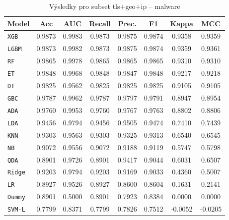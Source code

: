 \begin{table}[H]
  \centering
  \small
  \caption{Výsledky pro subset tls+geo+ip – malware}
  \begin{tabular}{|l|c|c|c|c|c|c|c|}
    \hline
    \textbf{Model} & \textbf{Acc} & \textbf{AUC} & \textbf{Recall} & \textbf{Prec.} & \textbf{F1} & \textbf{Kappa} & \textbf{MCC} \\
    \hline
    \texttt{XGB} & 0.9873 & 0.9983 & 0.9873 & 0.9875 & 0.9874 & 0.9358 & 0.9359 \\
    \texttt{LGBM} & 0.9873 & 0.9982 & 0.9873 & 0.9875 & 0.9874 & 0.9359 & 0.9361 \\
    \texttt{RF} & 0.9865 & 0.9978 & 0.9865 & 0.9865 & 0.9865 & 0.9310 & 0.9310 \\
    \texttt{ET} & 0.9848 & 0.9968 & 0.9848 & 0.9847 & 0.9848 & 0.9217 & 0.9218 \\
    \texttt{DT} & 0.9825 & 0.9562 & 0.9825 & 0.9825 & 0.9825 & 0.9105 & 0.9105 \\
    \texttt{GBC} & 0.9787 & 0.9962 & 0.9787 & 0.9797 & 0.9791 & 0.8947 & 0.8954 \\
    \texttt{ADA} & 0.9760 & 0.9953 & 0.9760 & 0.9767 & 0.9763 & 0.8802 & 0.8806 \\
    \texttt{LDA} & 0.9456 & 0.9794 & 0.9456 & 0.9505 & 0.9474 & 0.7410 & 0.7439 \\
    \texttt{KNN} & 0.9303 & 0.9563 & 0.9303 & 0.9325 & 0.9313 & 0.6540 & 0.6545 \\
    \texttt{NB} & 0.9072 & 0.9556 & 0.9072 & 0.9188 & 0.9119 & 0.5747 & 0.5798 \\
    \texttt{QDA} & 0.8901 & 0.9726 & 0.8901 & 0.9417 & 0.9044 & 0.6031 & 0.6507 \\
    \texttt{Ridge} & 0.9203 & 0.9794 & 0.9203 & 0.9169 & 0.9033 & 0.4360 & 0.5007 \\
    \texttt{LR} & 0.8927 & 0.9526 & 0.8927 & 0.8600 & 0.8604 & 0.1631 & 0.2141 \\
    \texttt{Dummy} & 0.8901 & 0.5000 & 0.8901 & 0.7923 & 0.8384 & 0.0000 & 0.0000 \\
    \texttt{SVM-L} & 0.7799 & 0.8371 & 0.7799 & 0.7826 & 0.7512 & -0.0052 & -0.0205 \\
    \hline
  \end{tabular}
\end{table}
\vspace{0.5cm}


